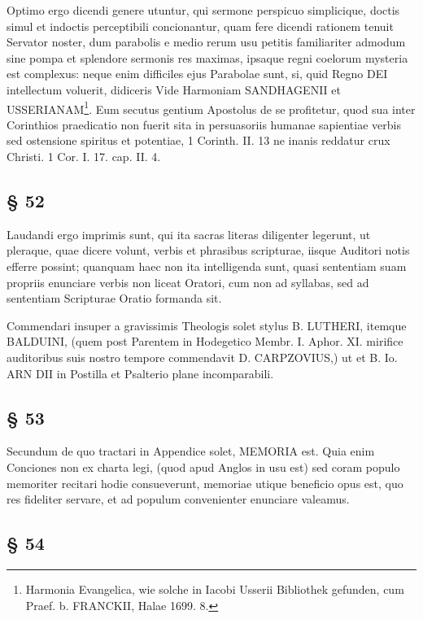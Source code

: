 Optimo ergo dicendi genere utuntur, qui sermone perspicuo simplicique, doctis simul et indoctis perceptibili concionantur, quam fere dicendi rationem tenuit
Servator noster, dum parabolis e medio rerum usu petitis familiariter admodum sine pompa et splendore sermonis res maximas, ipsaque regni coelorum mysteria est complexus: neque enim difficiles ejus Parabolae sunt, si, quid Regno DEI intellectum voluerit, didiceris Vide Harmoniam SANDHAGENII et USSERIANAM\footnote{Harmonia Evangelica, wie solche in Iacobi Usserii Bibliothek gefunden, cum Praef. b. FRANCKII, Halae 1699. 8.}. Eum secutus gentium Apostolus de se profitetur, quod sua inter Corinthios praedicatio non fuerit sita in persuasoriis humanae sapientiae verbis sed ostensione spiritus et potentiae, 1 Corinth. II. 13 ne inanis reddatur crux Christi. 1 Cor. I. 17. cap. II. 4.

\subsection{§ 52}

Laudandi ergo imprimis sunt, qui ita sacras literas diligenter legerunt, ut pleraque, quae dicere volunt, verbis et phrasibus scripturae, iisque Auditori notis efferre possint; quanquam haec non ita intelligenda sunt, quasi sententiam suam propriis enunciare verbis non liceat Oratori, cum non ad syllabas, sed ad sententiam Scripturae Oratio formanda sit.

Commendari insuper a gravissimis Theologis solet stylus B. LUTHERI, itemque BALDUINI, (quem post Parentem in Hodegetico Membr. I. Aphor. XI. mirifice auditoribus suis nostro tempore commendavit D. CARPZOVIUS,) ut et B. Io. ARN DII in Postilla et Psalterio plane incomparabili.

\subsection{§ 53}

Secundum de quo tractari in Appendice solet, MEMORIA est. Quia enim Conciones non ex charta legi,
(quod apud Anglos in usu est) sed coram populo memoriter recitari hodie consueverunt, memoriae utique beneficio opus est, quo res fideliter servare, et ad populum convenienter enunciare valeamus.

\subsection{§ 54}


